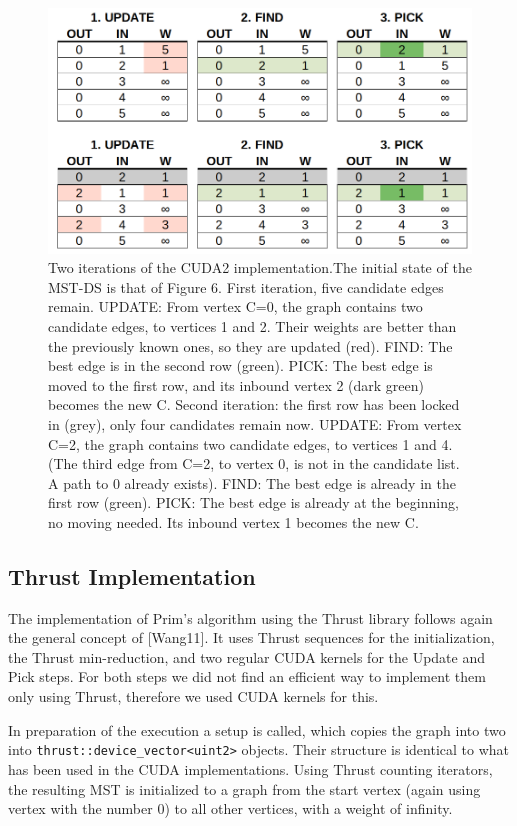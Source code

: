 \documentclass[sigconf,nonacm]{acmart}
\begin{document}
\begin{figure}
\centering
\includegraphics[width=0.7\linewidth]{algo}
\caption{Two iterations of the CUDA2 implementation.The initial state of the MST-DS is that of Figure 6. First iteration, five candidate edges remain. UPDATE: From vertex C=0, the graph contains two candidate edges, to vertices 1 and 2. Their weights are better than the previously known ones, so they are updated (red). FIND: The best edge is in the second row (green). PICK: The best edge is moved to the first row, and its inbound vertex 2 (dark green) becomes the new C. Second iteration: the first row has been locked in (grey), only four candidates remain now. UPDATE: From vertex C=2, the graph contains two candidate edges, to vertices 1 and 4. (The third edge from C=2, to vertex 0, is not in the candidate list. A path to 0 already exists). FIND: The best edge is already in the first row (green). PICK: The best edge is already at the beginning, no moving needed. Its inbound vertex 1 becomes the new C.}
\label{fig:algo}
\end{figure}

\subsection{Thrust Implementation}

The implementation of Prim's algorithm using the Thrust library follows again the general concept of [Wang11]. It uses Thrust sequences for the initialization, the Thrust min-reduction, and two regular CUDA kernels for the Update and Pick steps. For both steps we did not find an efficient way to implement them only using Thrust, therefore we used CUDA kernels for this.

In preparation of the execution a setup is called, which copies the graph into two into \texttt{thrust::device\_vector<uint2>}
objects. Their structure is identical to what has been used in the CUDA implementations. Using Thrust counting iterators, the resulting MST is initialized to a graph from the start vertex (again using vertex with the number 0) to all other vertices, with a weight of infinity.
\end{document}

